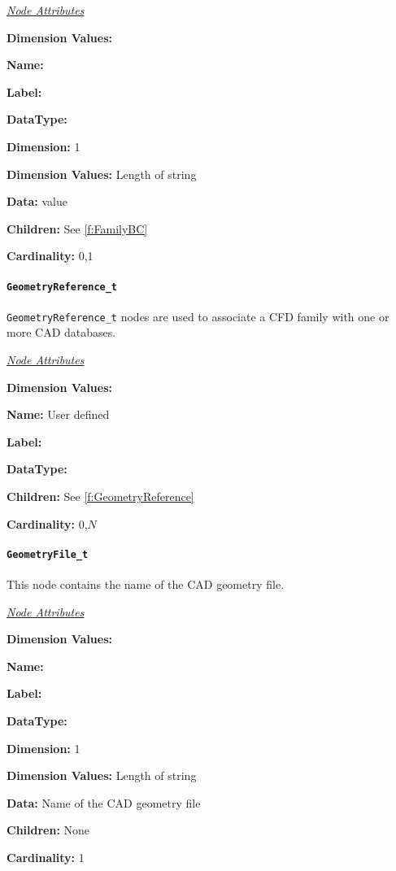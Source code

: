 \textit{\uline{Node Attributes}}
\begin{Ventryic}{\textbf{Dimension Values:}}
\item [\textbf{Name:}]
\item [\textbf{Label:}]
\item [\textbf{DataType:}]
\item [\textbf{Dimension:}]
      1
\item [\textbf{Dimension Values:}]
      Length of string
\item [\textbf{Data:}]
       value
\item [\textbf{Children:}]
      See \autoref{f:FamilyBC}
\item [\textbf{Cardinality:}]
      0,1
\end{Ventryic}

\paragraph{\texttt{GeometryReference\_t}}

\texttt{GeometryReference\_t} nodes are used to associate
a CFD family with one or more CAD databases.

\textit{\uline{Node Attributes}}
\begin{Ventryic}{\textbf{Dimension Values:}}
\item [\textbf{Name:}]
      User defined
\item [\textbf{Label:}]
\item [\textbf{DataType:}]
\item [\textbf{Children:}]
      See \autoref{f:GeometryReference}
\item [\textbf{Cardinality:}]
      0,$N$
\end{Ventryic}

\paragraph{\texttt{GeometryFile\_t}}

This node contains the name of the CAD geometry file.

\textit{\uline{Node Attributes}}
\begin{Ventryic}{\textbf{Dimension Values:}}
\item [\textbf{Name:}]
\item [\textbf{Label:}]
\item [\textbf{DataType:}]
\item [\textbf{Dimension:}]
      1
\item [\textbf{Dimension Values:}]
      Length of string
\item [\textbf{Data:}]
      Name of the CAD geometry file
\item [\textbf{Children:}]
      None
\item [\textbf{Cardinality:}]
      1
\end{Ventryic}

